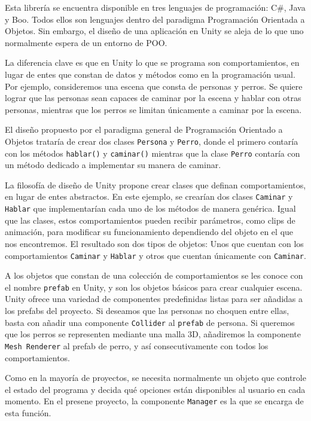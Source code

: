\documentclass[12pt,a4paper,openright,oneside]{article}
\numberwithin{equation}{section}
\theoremstyle{definition}
\begin{document}
Esta librería se encuentra disponible en tres lenguajes de programación: C\#, Java y Boo. Todos ellos son lenguajes dentro del paradigma Programación Orientada a Objetos. Sin embargo, el diseño de una aplicación en Unity se aleja de lo que uno normalmente espera de un entorno de POO.

La diferencia clave es que en Unity lo que se programa son comportamientos, en lugar de entes que constan de datos y métodos como en la programación usual.
Por ejemplo, consideremos una escena que consta de personas y perros. Se quiere lograr que las personas sean capaces de caminar por la escena y hablar con otras personas, mientras que los perros se limitan únicamente a caminar por la escena.

El diseño propuesto por el paradigma general de Programación Orientado a Objetos trataría de crear dos clases \texttt{Persona} y \texttt{Perro}, donde el primero contaría con los métodos \texttt{hablar()} y \texttt{caminar()} mientras que la clase \texttt{Perro} contaría con un método dedicado a implementar su manera de caminar.

La filosofía de diseño de Unity propone crear clases que definan comportamientos, en lugar de entes abstractos. En este ejemplo, se crearían dos clases \texttt{Caminar} y \texttt{Hablar} que implementarían cada uno de los métodos de manera genérica. Igual que las clases, estos comportamientos pueden recibir parámetros, como clips de animación, para modificar su funcionamiento dependiendo del objeto en el que nos encontremos. El resultado son dos tipos de objetos: Unos que cuentan con los comportamientos \texttt{Caminar} y \texttt{Hablar} y otros que cuentan únicamente con \texttt{Caminar}.

A los objetos que constan de una colección de comportamientos se les conoce con el nombre \texttt{prefab} en Unity, y son los objetos básicos para crear cualquier escena. Unity ofrece una variedad de componentes predefinidas listas para ser añadidas a los prefabs del proyecto. Si deseamos que las personas no choquen entre ellas, basta con añadir una componente \texttt{Collider} al \texttt{prefab} de persona. Si queremos que los perros se representen mediante una malla 3D, añadiremos la componente \texttt{Mesh Renderer} al prefab de perro, y así consecutivamente con todos los comportamientos. 

Como en la mayoría de proyectos, se necesita normalmente un objeto que controle el estado del programa y decida qué opciones están disponibles al usuario en cada momento. En el presene proyecto, la componente \texttt{Manager} es la que se encarga de esta función.
\end{document}
